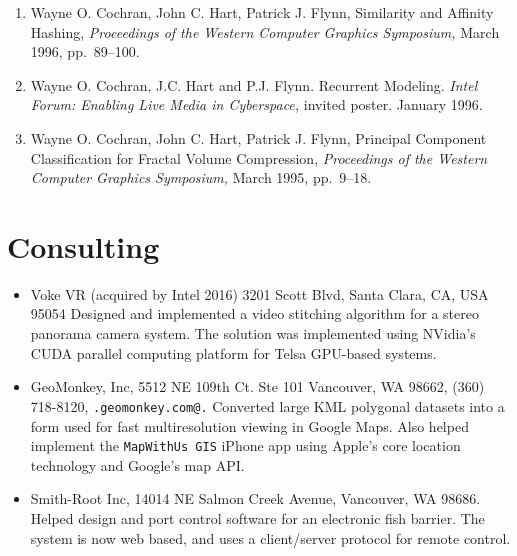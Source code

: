 \documentclass[10pt]{article}
\begin{document}
\begin{enumerate}
\item
Wayne O. Cochran, John C. Hart, Patrick J. Flynn,
Similarity and Affinity Hashing,
{\em Proceedings of the Western Computer Graphics Symposium,}
March 1996, pp.~89--100.

\item
Wayne O. Cochran, J.C. Hart and P.J. Flynn. Recurrent Modeling. 
{\em Intel Forum: Enabling Live Media in Cyberspace,} 
invited poster. January 1996.

\item
Wayne O. Cochran, John C. Hart, Patrick J. Flynn,
Principal Component Classification for Fractal Volume Compression,
{\em Proceedings of the Western Computer Graphics Symposium,}
March 1995, \mbox{pp.~9--18}.

\end{enumerate}


\section*{Consulting}

\begin{itemize}


\item Voke VR (acquired by Intel 2016) 
3201 Scott Blvd, Santa Clara, CA, USA 95054
Designed and implemented a video stitching algorithm for
a stereo panorama camera system. The solution was
implemented using NVidia's CUDA parallel computing platform
for Telsa GPU-based systems.


\item GeoMonkey, Inc, 
5512 NE 109th Ct. Ste 101
Vancouver, WA 98662,
(360) 718-8120,
{\tt \verb@www.geomonkey.com@.}  
  Converted large KML polygonal datasets into a form used for
  fast multiresolution viewing in Google Maps.
  Also helped implement the {\tt MapWithUs GIS} iPhone app using Apple's core location technology
  and Google's map API.
\item Smith-Root Inc, 14014 NE Salmon Creek Avenue, Vancouver, WA 98686.\\
Helped design and port control software for an
electronic fish barrier. The system is now web based, and uses a 
client/server protocol for remote control.
\end{itemize}
\end{document}
